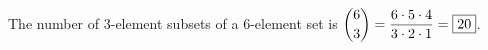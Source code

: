 The number of $3$-element subsets of a $6$-element set is $\dbinom63=\dfrac{6\cdot5\cdot4}{3\cdot2\cdot1}=\boxed{20}$.
